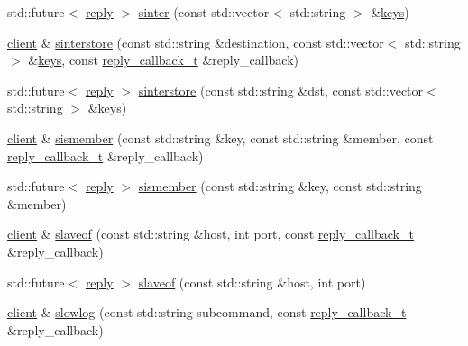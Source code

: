 \begin{DoxyCompactItemize}
\item 
std\+::future$<$ \hyperlink{classcpp__redis_1_1reply}{reply} $>$ \hyperlink{classcpp__redis_1_1client_a069df07b6b3f18f5b2c215c67161c115}{sinter} (const std\+::vector$<$ std\+::string $>$ \&\hyperlink{classcpp__redis_1_1client_acb7845a206b2321e6919c2f38282c322}{keys})
\item 
\hyperlink{classcpp__redis_1_1client}{client} \& \hyperlink{classcpp__redis_1_1client_a55f1722f17eaaa255196851efb0bdb93}{sinterstore} (const std\+::string \&destination, const std\+::vector$<$ std\+::string $>$ \&\hyperlink{classcpp__redis_1_1client_acb7845a206b2321e6919c2f38282c322}{keys}, const \hyperlink{classcpp__redis_1_1client_a061a1140d36d2eaeda82b09a0bb3f9f2}{reply\+\_\+callback\+\_\+t} \&reply\+\_\+callback)
\item 
std\+::future$<$ \hyperlink{classcpp__redis_1_1reply}{reply} $>$ \hyperlink{classcpp__redis_1_1client_aa105a26578624af221f16675c0fbfc55}{sinterstore} (const std\+::string \&dst, const std\+::vector$<$ std\+::string $>$ \&\hyperlink{classcpp__redis_1_1client_acb7845a206b2321e6919c2f38282c322}{keys})
\item 
\hyperlink{classcpp__redis_1_1client}{client} \& \hyperlink{classcpp__redis_1_1client_a369fb068437dfb3f63091d031174cc19}{sismember} (const std\+::string \&key, const std\+::string \&member, const \hyperlink{classcpp__redis_1_1client_a061a1140d36d2eaeda82b09a0bb3f9f2}{reply\+\_\+callback\+\_\+t} \&reply\+\_\+callback)
\item 
std\+::future$<$ \hyperlink{classcpp__redis_1_1reply}{reply} $>$ \hyperlink{classcpp__redis_1_1client_af4ba6bfa37b81759324c726ef77acdbc}{sismember} (const std\+::string \&key, const std\+::string \&member)
\item 
\hyperlink{classcpp__redis_1_1client}{client} \& \hyperlink{classcpp__redis_1_1client_a5a8ff87da211196ca80a7c4badb0c378}{slaveof} (const std\+::string \&host, int port, const \hyperlink{classcpp__redis_1_1client_a061a1140d36d2eaeda82b09a0bb3f9f2}{reply\+\_\+callback\+\_\+t} \&reply\+\_\+callback)
\item 
std\+::future$<$ \hyperlink{classcpp__redis_1_1reply}{reply} $>$ \hyperlink{classcpp__redis_1_1client_a1731c94f72a209ffcba25767b8cab386}{slaveof} (const std\+::string \&host, int port)
\item 
\hyperlink{classcpp__redis_1_1client}{client} \& \hyperlink{classcpp__redis_1_1client_a2b9fce6f9d5c9ea1038a1c4b43b16a6d}{slowlog} (const std\+::string subcommand, const \hyperlink{classcpp__redis_1_1client_a061a1140d36d2eaeda82b09a0bb3f9f2}{reply\+\_\+callback\+\_\+t} \&reply\+\_\+callback)

\end{DoxyCompactItemize}

